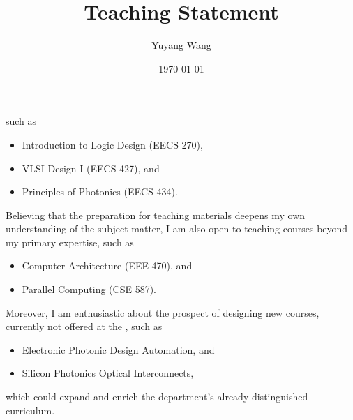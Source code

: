 



\title{Teaching Statement}

\def\courseOneName{Introduction to Logic Design}
\def\courseOneNumber{EECS 270}
\def\courseTwoName{VLSI Design I}
\def\courseTwoNumber{EECS 427}
\def\courseThreeName{Principles of Photonics}
\def\courseThreeNumber{EECS 434}
\def\courseFourName{Computer Architecture}
\def\courseFourNumber{EEE 470}
\def\courseFiveName{Parallel Computing}
\def\courseFiveNumber{CSE 587}
\def\courseSixName{Electronic Photonic Design Automation}
\def\courseSevenName{Silicon Photonics Optical Interconnects}

\def\rsCustom{%
such as 
\begin{itemize}[nosep]
    \item \courseOneName{} (\courseOneNumber{}),
    \item \courseTwoName{} (\courseTwoNumber{}), and
    \item \courseThreeName{} (\courseThreeNumber{}).
\end{itemize}
Believing that the preparation for teaching materials deepens my own understanding of the subject matter, I am also open to teaching courses beyond my primary expertise, such as
\begin{itemize}[nosep]
    \item \courseFourName{} (\courseFourNumber{}), and
    \item \courseFiveName{} (\courseFiveNumber{}).
\end{itemize}
Moreover, I am enthusiastic about the prospect of designing new courses, currently not offered at the \appSchool{}, such as
\begin{itemize}[nosep]
    \item \courseSixName{}, and 
    \item \courseSevenName{},
\end{itemize}
which could expand and enrich the department's already distinguished curriculum.
}

\author{Yuyang Wang}
\date{\today}
\makeatletter
\fancyfoot[L]{\scshape \MakeLowercase{\@author}}
\fancyfoot[R]{{\scshape \MakeLowercase{\@title}}\quad{\LARGE\sfrac{\thepage}{\pageref*{LastPage}}}}
\makeatother



\maketitle%
\thispagestyle{fancy}


\rsCustom{}


\footnotesize



